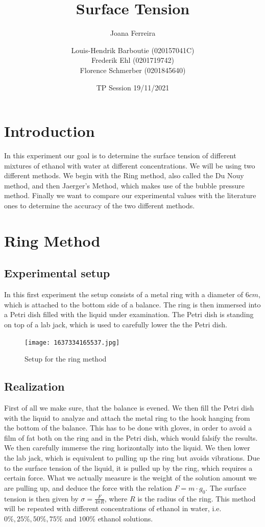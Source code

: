 \documentclass{scrartcl}
\title{Surface Tension}
\subtitle{Joana Ferreira}
\date{TP Session 19/11/2021}
\author{Louis-Hendrik Barboutie (020157041C)\\ Frederik Ehl (0201719742) \\ Florence Schmerber (0201845640)}
\begin{document}
\maketitle

\clearpage

\tableofcontents
\listoffigures
	
\clearpage

\section{Introduction}
In this experiment our goal is to determine the surface tension of different mixtures of ethanol with water at different concentrations. We will be using two different methods. We begin with the Ring method, also called the Du Nouy method, and then Jaerger's Method, which makes use of the bubble pressure method. Finally we want to compare our experimental values with the literature ones to determine the accuracy of the two different methods.

\section{Ring Method}
\subsection{Experimental setup}

In this first experiment the setup consists of a metal ring with a diameter of $6cm$, which is attached to the bottom side of a balance. The ring is then immersed into a Petri dish filled with the liquid under examination.
The Petri dish is standing on top of a lab jack, which is used to carefully lower the the Petri dish. 

\begin{figure}[h]
    \centering
    \texttt{[image: 1637334165537.jpg]}
    \caption{Setup for the ring method}
    \label{fig:1}
\end{figure}


\subsection{Realization}
First of all we make sure, that the balance is evened. We then fill the Petri dish with the liquid to analyze and attach the metal ring to the hook hanging from the bottom of the balance. This has to be done with gloves, in order to avoid a film of fat both on the ring and in the Petri dish, which would falsify the results. We then carefully immerse the ring horizontally into the liquid. We then lower the lab jack, which is equivalent to pulling up the ring but avoids vibrations. Due to the surface tension of the liquid, it is pulled up by the ring, which requires a certain force. What we actually measure is the weight of the solution amount we are pulling up, and deduce the force with the relation $F = m \cdot g_0$. The surface tension is then given by $\sigma = \frac{F}{4 \pi R}$, where $R$ is the radius of the ring.
This method will be repeated with different concentrations of ethanol in water, i.e. $0\%, 25\%, 50\%, 75\%$ and $100\%$ ethanol solutions.
\end{document}
